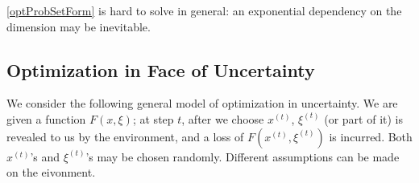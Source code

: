 \documentclass[openany]{book}
\newtheorem{theorem}{Theorem}[chapter]
\theoremstyle{definition}
\theoremstyle{remark}
\begin{document}
\eqref{optProbSetForm} is hard to solve in general: an exponential dependency on the dimension may be inevitable.
\begin{comment}
For instance, consider the following problem:
\begin{equation}\label{unitBoxMin}
    \min_{x\in[0,1]^n}f(x),
\end{equation}
where $f$ is $\lambda$-Lipschitz continuous over $[0,1]^n$. We want to find an $\epsilon$-additive approximate solution.

One can use the uniform grid method: Divide each dimension into $\lceil\frac{\lambda\sqrt{n}}{2\epsilon}\rceil$ uniform intervals, and consider all grid points. We can get an $\epsilon$-approximate solution with a query complexity of $(\lceil\frac{\lambda\sqrt{n}}{2\epsilon}\rceil+1)^n$. What's more, such a query complexity is necessary.

\begin{theorem}
    The query complexity of problem \eqref{unitBoxMin} with a zeroth order oracle is at least $(\lceil \frac{\lambda}{2\epsilon}\rceil-1)^n$.
\end{theorem}
\begin{proof}
    Divide each dimension into $\lceil \frac{\lambda}{2\epsilon}\rceil-1$ uniform intervals. For each query $x$, return $f(x)=0$. Then the algorithm will conclude the minimum is $0$. However, if the query complexity is less than $(\lceil \frac{\lambda}{2\epsilon}\rceil-1)^n$, then there will be one cube $\prod_{i=1}^n[a_i,b_i]$ whose vertices are grid points and no interior point of this cube is queried. We can then set $f(x)=\min_{1\le i\le n}\min\{\lambda(x_i-a_i),\lambda(b_i-x_i)\}$ on $\prod_{i=1}^n[a_i,b_i]$ and $0$ everywhere else. One can check that $f$ is $\lambda$-Lipschitz continuous over $[0,1]^n$ but the optimum value is $(\frac{\lambda}{2})/(\lceil \frac{\lambda}{2\epsilon}\rceil-1)>\epsilon$.
\end{proof}

In economics, and specifically monotone comparative statics, the following parameterized optimization problem is often considered:
\begin{equation}
    \min_{x\in C_t}f(x).
\end{equation}
Here $t\in T$ is a parameter. Monotone comparative statics are interested especially in cases when the optimal solution is a monotone function of $t$.
\end{comment}

\subsection{Optimization in Face of Uncertainty}
We consider the following general model of optimization in uncertainty. We are given a function $F(x,\xi)$; at step $t$, after we choose $x^{(t)}$, $\xi^{(t)}$ (or part of it) is revealed to us by the environment, and a loss of $F(x^{(t)},\xi^{(t)})$ is incurred. Both $x^{(t)}$'s and $\xi^{(t)}$'s may be chosen randomly. Different assumptions can be made on the eivonment.
\end{document}
